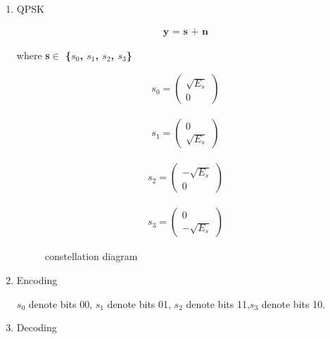 \begin{enumerate}[label=\thesubsection.\arabic*.,ref=\thesubsection.\theenumi]



\item 
QPSK 

\begin{align}
\textbf{y = s + n}
\end{align}

where \textbf{ s$\in$ \{$s_0$, $s_1$, $s_2$, $s_3$\} }

\begin{align}
    s_0 = 
    \begin{pmatrix}
     \sqrt{E_s} \\
     0
    \end{pmatrix}
\end{align}

\begin{align}
    s_1 = 
    \begin{pmatrix}
     0\\
     \sqrt{E_s}
    \end{pmatrix}
\end{align}


\begin{align}
    s_2 = 
    \begin{pmatrix}
     -\sqrt{E_s}\\
     0
    \end{pmatrix}
\end{align}


\begin{align}
    s_3 = 
    \begin{pmatrix}
     0\\
     -\sqrt{E_s}
    \end{pmatrix}
\end{align}

\begin{figure}[!ht]
                \resizebox{\columnwidth}{!}{}
\label{fig:ee18btech11041_fig1}
\caption{constellation diagram}
\end{figure}


\item Encoding

$s_0$ denote bits 00, $s_1$ denote bits 01, $s_2$ denote bits 11,$s_3$ denote bits 10.

\item Decoding




\end{enumerate}

